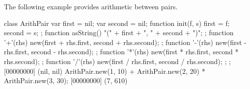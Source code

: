 The following example provides arithmetic between pairs.

\begin{urbiscript}
class ArithPair
{
  var first = nil;
  var second = nil;
  function init(f, s) { first = f;   second = s;  };
  function asString() { "(" + first + ", " + second + ")"; };
  function '+'(rhs) { new(first + rhs.first, second + rhs.second); };
  function '-'(rhs) { new(first - rhs.first, second - rhs.second); };
  function '*'(rhs) { new(first * rhs.first, second * rhs.second); };
  function '/'(rhs) { new(first / rhs.first, second / rhs.second); };
};
[00000000] (nil, nil)
ArithPair.new(1, 10) + ArithPair.new(2, 20) * ArithPair.new(3, 30);
[00000000] (7, 610)
\end{urbiscript}




